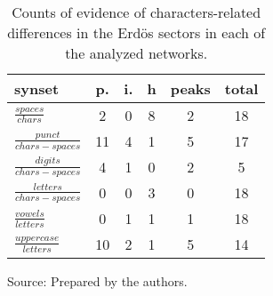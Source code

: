 \begin{table}[h!]
\begin{center}
\caption{Counts of evidence of characters-related differences in the Erd\"os sectors in each of the analyzed networks.}
	\def\arraystretch{1.5}
\begin{tabular}{| l || c | c | c || c | c |}\hline
{\bf synset} & {\bf p.} & {\bf i.} & {\bf h} & {\bf peaks} & {\bf total} \\\hline\hline
$\frac{spaces}{chars}$ & 2  & 0  & 8  & 2  & 18 \\
$\frac{punct}{chars-spaces}$ & 11  & 4  & 1  & 5  & 17 \\
$\frac{digits}{chars-spaces}$ & 4  & 1  & 0  & 2  & 5 \\\hline
$\frac{letters}{chars-spaces}$ & 0  & 0  & 3  & 0  & 18 \\
$\frac{vowels}{letters}$ & 0  & 1  & 1  & 1  & 18 \\
$\frac{uppercase}{letters}$ & 10  & 2  & 1  & 5  & 14 \\\hline
\end{tabular}
\begin{flushleft}
		Source: Prepared by the authors.\
\end{flushleft}
\end{center}
\end{table}

